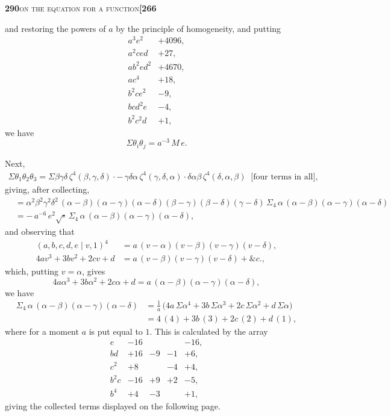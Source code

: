 \documentclass[11pt]{article}
\newcommand{\Cdel}{\mid}
\begin{document}
\newpage
\setcounter{page}{290}

\noindent\textbf{290}\hfill\textsc{on the equation for a function}\hfill\textbf{[266}

\medskip

\noindent and restoring the powers of $a$ by the principle of homogeneity, and putting
\[
\begin{array}{rr}
a^3 e^2     & +4096,\\
a^2 c e d   & +27,\\
a b^2 e d^2 & +4670,\\
a c^4       & +18,\\
b^2 c e^2   & -9,\\
b c d^2 e   & -4,\\
b^2 c^2 d   & +1,
\end{array}
\]
we have
\[
   \Sigma\theta_i\theta_j = a^{-3}\,M\,e.
\]

\medskip

\noindent Next,
\[
\begin{aligned}
   \Sigma\theta_1\theta_2\theta_3 = \Sigma\beta\gamma\delta\,\zeta^4(\beta, \gamma, \delta)\cdot-\,\gamma\delta\alpha\,\zeta^4(\gamma, \delta, \alpha)\cdot\delta\alpha\beta\,\zeta^4(\delta, \alpha, \beta)\;\;\text{[four terms in all]},
\end{aligned}
\]
giving, after collecting,
\[
\begin{aligned}
   & = \alpha^2\beta^2\gamma^2\delta^2\,(\alpha - \beta)(\alpha - \gamma)(\alpha - \delta)(\beta - \gamma)(\beta - \delta)(\gamma - \delta)\,\Sigma_4\,\alpha\,(\alpha - \beta)(\alpha - \gamma)(\alpha - \delta)\\
   & = -\,a^{-6}\,e^2\sqrt{\square}\,\Sigma_4\,\alpha\,(\alpha - \beta)(\alpha - \gamma)(\alpha - \delta),
\end{aligned}
\]
and observing that
\[
\begin{aligned}
   (a, b, c, d, e \Cdel v, 1)^4 &= a\,(v - \alpha)(v - \beta)(v - \gamma)(v - \delta),\\
   4 a v^3 + 3 b v^2 + 2 c v + d &= a\,(v - \beta)(v - \gamma)(v - \delta) + \&c.,
\end{aligned}
\]
which, putting $v = \alpha$, gives
\[
   4 a \alpha^3 + 3 b \alpha^2 + 2 c \alpha + d = a\,(\alpha - \beta)(\alpha - \gamma)(\alpha - \delta),
\]
we have
\[
\begin{aligned}
   \Sigma_4\,\alpha\,(\alpha - \beta)(\alpha - \gamma)(\alpha - \delta) &= \tfrac{1}{a}\,\bigl(4 a\,\Sigma\alpha^4 + 3 b\,\Sigma\alpha^3 + 2 c\,\Sigma\alpha^2 + d\,\Sigma\alpha\bigr)\\
   &= 4\,(4) + 3 b\,(3) + 2 c\,(2) + d\,(1),
\end{aligned}
\]
where for a moment $a$ is put equal to $1$. This is calculated by the array
\[
\begin{array}{rrrrr}
   e       & -16 &     &     & -16,\\
   b d     & +16 & -9  & -1  & +6,\\
   c^2     & +8  &     & -4  & +4,\\
   b^2 c   & -16 & +9  & +2  & -5,\\
   b^4     & +4  & -3  &     & +1,
\end{array}
\]
giving the collected terms displayed on the following page.
\end{document}
